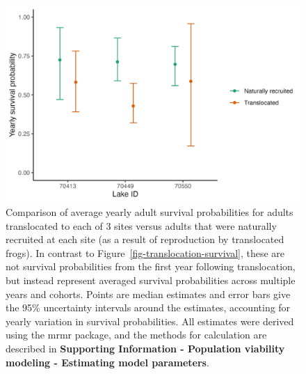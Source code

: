 \documentclass[
  letterpaper,
  DIV=11,
  numbers=noendperiod]{scrartcl}
\begin{document}
\newpage

\begin{figure}

{\centering \includegraphics[width=6.04167in,height=\textheight]{figures/compare_surv_probs.jpg}

}

\caption{\label{fig-compare_surv_probs}Comparison of average yearly
adult survival probabilities for adults translocated to each of 3 sites
versus adults that were naturally recruited at each site (as a result of
reproduction by translocated frogs). In contrast to
Figure~\ref{fig-translocation-survival}, these are not survival
probabilities from the first year following translocation, but instead
represent averaged survival probabilities across multiple years and
cohorts. Points are median estimates and error bars give the 95\%
uncertainty intervals around the estimates, accounting for yearly
variation in survival probabilities. All estimates were derived using
the mrmr package, and the methods for calculation are described in
\textbf{Supporting Information - Population viability modeling -
Estimating model parameters}.}

\end{figure}

\newpage
\end{document}
